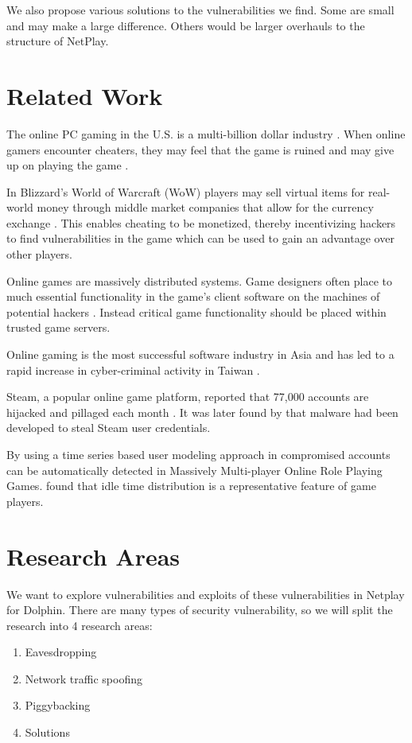 \documentclass[conference]{IEEEtran}
\begin{document}
We also propose various solutions to the vulnerabilities we find.
Some are small and may make a large difference.
Others would be larger overhauls to the structure of NetPlay.


\section{Related Work}
The online PC gaming in the U.S. is a multi-billion dollar industry \cite{takahashi15}. When online gamers encounter cheaters, they may feel that the game is ruined and may give up on playing the game \cite{yan02}. 

In Blizzard's World of Warcraft (WoW) players may sell virtual items for real-world money through middle market companies that allow for the currency exchange \cite{mcgraw09}. This enables cheating to be monetized, thereby incentivizing hackers to find vulnerabilities in the game which can be used to gain an advantage over other players.

Online games are massively distributed systems. Game designers often place to much essential functionality in the game's client software on the machines of potential hackers \cite{mcgraw09}. Instead critical game functionality should be placed within trusted game servers.

Online gaming is the most successful software industry in Asia and has led to a rapid increase in cyber-criminal activity in Taiwan \cite{chen04}. 

Steam, a popular online game platform, reported that 77,000 accounts are hijacked and pillaged each month \cite{steam15}. It was later found by \cite{pontiroli16} that malware had been developed to steal Steam user credentials.

By using a time series based user modeling approach in \cite{oh12} compromised accounts can be automatically detected in Massively Multi-player Online Role Playing Games. \cite{chen07} found that idle time distribution is a representative feature of game players.

\section{Research Areas}
We want to explore vulnerabilities and exploits of these vulnerabilities in Netplay for Dolphin.
There are many types of security vulnerability, so we will split the research into 4 research areas:
\vspace{0.5cm}
\begin{enumerate}  
\item Eavesdropping
\item Network traffic spoofing
\item Piggybacking
\item Solutions
\end{enumerate}
\vspace{0.5cm}
\end{document}
